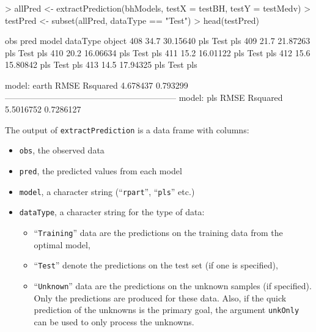 \documentclass[12pt]{article}
\begin{document}
\begin{small}
\begin{Schunk}
\begin{Sinput}
> allPred <- extractPrediction(bhModels, testX = testBH, testY = testMedv)
> testPred <- subset(allPred, dataType == "Test")
> head(testPred)
\end{Sinput}
\begin{Soutput}
     obs     pred model dataType object
408 34.7 30.15640   pls     Test    pls
409 21.7 21.87263   pls     Test    pls
410 20.2 16.06634   pls     Test    pls
411 15.2 16.01122   pls     Test    pls
412 15.6 15.80842   pls     Test    pls
413 14.5 17.94325   pls     Test    pls
\end{Soutput}
\begin{Soutput}
model: earth
    RMSE Rsquared 
4.678437 0.793299 
------------------------------------------------------------ 
model: pls
     RMSE  Rsquared 
5.5016752 0.7286127 
\end{Soutput}
\end{Schunk}
\end{small}
The output of \texttt{extractPrediction} is a data frame with columns:
   \begin{itemize}   
      \item \texttt{obs}, the observed data
      \item \texttt{pred}, the predicted values from each model
      \item \texttt{model}, a character string (``\texttt{rpart}'', ``\texttt{pls}'' etc.)
      \item \texttt{dataType}, a character string for the type of data:
      \begin{itemize}
         \item ``\texttt{Training}'' data are the predictions on the training data from
            the optimal model,
         \item ``\texttt{Test}'' denote the predictions on the test set (if one is specified),
         \item ``\texttt{Unknown}'' data are the predictions on the unknown samples (if specified). 
         Only the predictions are produced for these data. Also, if the quick prediction of the unknowns
         is the primary goal, the argument \texttt{unkOnly} can be used to only process the unknowns.
      \end{itemize}
   \end{itemize}      
\end{document}
